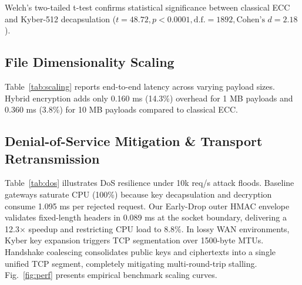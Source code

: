 \documentclass{llncs}
\begin{document}
Welch's two-tailed t-test confirms statistical significance between classical ECC and Kyber-512 decapsulation ($t = 48.72, p < 0.0001, \text{d.f.} = 1892, \text{Cohen's } d = 2.18$).

\subsection{File Dimensionality Scaling}
Table~\ref{tab:scaling} reports end-to-end latency across varying payload sizes. Hybrid encryption adds only 0.160 ms (14.3\%) overhead for 1 MB payloads and 0.360 ms (3.8\%) for 10 MB payloads compared to classical ECC.

\begin{table}[!t]
\centering
\caption{File dimensionality scaling performance across cryptographic modes.}
\label{tab:scaling}
\scriptsize
\setlength{\tabcolsep}{4pt}
\end{table}

\subsection{Denial-of-Service Mitigation \& Transport Retransmission}
Table~\ref{tab:dos} illustrates DoS resilience under 10k req/s attack floods. Baseline gateways saturate CPU (100\%) because key decapsulation and decryption consume 1.095 ms per rejected request. Our Early-Drop outer HMAC envelope validates fixed-length headers in 0.089 ms at the socket boundary, delivering a 12.3$\times$ speedup and restricting CPU load to 8.8\%. In lossy WAN environments, Kyber key expansion triggers TCP segmentation over 1500-byte MTUs. Handshake coalescing consolidates public keys and ciphertexts into a single unified TCP segment, completely mitigating multi-round-trip stalling. Fig.~\ref{fig:perf} presents empirical benchmark scaling curves.
\end{document}
